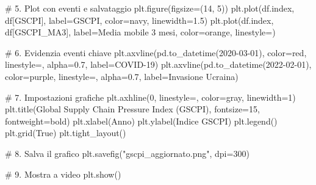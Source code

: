 \documentclass[
  11pt,
  letterpaper,
  DIV=11,
  numbers=noendperiod]{scrartcl}
\newenvironment{Shaded}{\begin{snugshade}}{\end{snugshade}}
\newcommand{\CommentTok}[1]{\textcolor[rgb]{0.37,0.37,0.37}{#1}}
\newcommand{\DecValTok}[1]{\textcolor[rgb]{0.68,0.00,0.00}{#1}}
\newcommand{\FloatTok}[1]{\textcolor[rgb]{0.68,0.00,0.00}{#1}}
\newcommand{\NormalTok}[1]{\textcolor[rgb]{0.00,0.23,0.31}{#1}}
\newcommand{\OperatorTok}[1]{\textcolor[rgb]{0.37,0.37,0.37}{#1}}
\newcommand{\StringTok}[1]{\textcolor[rgb]{0.13,0.47,0.30}{#1}}
\newcommand{\VariableTok}[1]{\textcolor[rgb]{0.07,0.07,0.07}{#1}}
\begin{document}
\begin{Shaded}
\begin{Highlighting}[]
\CommentTok{\# 5. Plot con eventi e salvataggio}
\NormalTok{plt.figure(figsize}\OperatorTok{=}\NormalTok{(}\DecValTok{14}\NormalTok{, }\DecValTok{5}\NormalTok{))}
\NormalTok{plt.plot(df.index, df[}\StringTok{\textquotesingle{}GSCPI\textquotesingle{}}\NormalTok{], label}\OperatorTok{=}\StringTok{\textquotesingle{}GSCPI\textquotesingle{}}\NormalTok{, color}\OperatorTok{=}\StringTok{\textquotesingle{}navy\textquotesingle{}}\NormalTok{, linewidth}\OperatorTok{=}\FloatTok{1.5}\NormalTok{)}
\NormalTok{plt.plot(df.index, df[}\StringTok{\textquotesingle{}GSCPI\_MA3\textquotesingle{}}\NormalTok{], label}\OperatorTok{=}\StringTok{\textquotesingle{}Media mobile 3 mesi\textquotesingle{}}\NormalTok{, color}\OperatorTok{=}\StringTok{\textquotesingle{}orange\textquotesingle{}}\NormalTok{, linestyle}\OperatorTok{=}\StringTok{\textquotesingle{}{-}{-}\textquotesingle{}}\NormalTok{)}

\CommentTok{\# 6. Evidenzia eventi chiave}
\NormalTok{plt.axvline(pd.to\_datetime(}\StringTok{\textquotesingle{}2020{-}03{-}01\textquotesingle{}}\NormalTok{), color}\OperatorTok{=}\StringTok{\textquotesingle{}red\textquotesingle{}}\NormalTok{, linestyle}\OperatorTok{=}\StringTok{\textquotesingle{}{-}{-}\textquotesingle{}}\NormalTok{, alpha}\OperatorTok{=}\FloatTok{0.7}\NormalTok{, label}\OperatorTok{=}\StringTok{\textquotesingle{}COVID{-}19\textquotesingle{}}\NormalTok{)}
\NormalTok{plt.axvline(pd.to\_datetime(}\StringTok{\textquotesingle{}2022{-}02{-}01\textquotesingle{}}\NormalTok{), color}\OperatorTok{=}\StringTok{\textquotesingle{}purple\textquotesingle{}}\NormalTok{, linestyle}\OperatorTok{=}\StringTok{\textquotesingle{}{-}{-}\textquotesingle{}}\NormalTok{, alpha}\OperatorTok{=}\FloatTok{0.7}\NormalTok{, label}\OperatorTok{=}\StringTok{\textquotesingle{}Invasione Ucraina\textquotesingle{}}\NormalTok{)}

\CommentTok{\# 7. Impostazioni grafiche}
\NormalTok{plt.axhline(}\DecValTok{0}\NormalTok{, linestyle}\OperatorTok{=}\StringTok{\textquotesingle{}{-}{-}\textquotesingle{}}\NormalTok{, color}\OperatorTok{=}\StringTok{\textquotesingle{}gray\textquotesingle{}}\NormalTok{, linewidth}\OperatorTok{=}\DecValTok{1}\NormalTok{)}
\NormalTok{plt.title(}\StringTok{\textquotesingle{}Global Supply Chain Pressure Index (GSCPI)\textquotesingle{}}\NormalTok{, fontsize}\OperatorTok{=}\DecValTok{15}\NormalTok{, fontweight}\OperatorTok{=}\StringTok{\textquotesingle{}bold\textquotesingle{}}\NormalTok{)}
\NormalTok{plt.xlabel(}\StringTok{\textquotesingle{}Anno\textquotesingle{}}\NormalTok{)}
\NormalTok{plt.ylabel(}\StringTok{\textquotesingle{}Indice GSCPI\textquotesingle{}}\NormalTok{)}
\NormalTok{plt.legend()}
\NormalTok{plt.grid(}\VariableTok{True}\NormalTok{)}
\NormalTok{plt.tight\_layout()}

\CommentTok{\# 8. Salva il grafico}
\NormalTok{plt.savefig(}\StringTok{"gscpi\_aggiornato.png"}\NormalTok{, dpi}\OperatorTok{=}\DecValTok{300}\NormalTok{)}

\CommentTok{\# 9. Mostra a video}
\NormalTok{plt.show()}
\end{Highlighting}
\end{Shaded}
\end{document}
